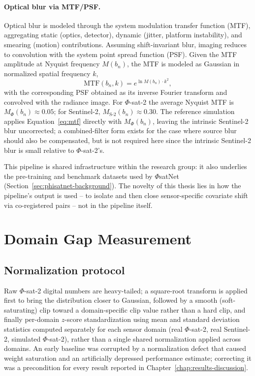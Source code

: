 \paragraph{Optical blur via MTF/PSF.}
Optical blur is modeled through the system modulation transfer function (MTF), aggregating static (optics, detector), dynamic (jitter, platform instability), and smearing (motion) contributions.
Assuming shift-invariant blur, imaging reduces to convolution with the system point spread function (PSF).
Given the MTF amplitude at Nyquist frequency $M(b_n)$, the MTF is modeled as Gaussian in normalized spatial frequency $k$,
\begin{equation}
    \text{MTF}(b_n, k) = e^{\ln M(b_n) \cdot k^2},
    \label{eq:mtf}
\end{equation}
with the corresponding PSF obtained as its inverse Fourier transform and convolved with the radiance image.
For $\Phi$-sat-2 the average Nyquist MTF is $M_\Phi(b_n) \approx 0.05$; for Sentinel-2, $M_{\text{S-2}}(b_n) \approx 0.30$.
The reference simulation applies Equation~\eqref{eq:mtf} directly with $M_\Phi(b_n)$, leaving the intrinsic Sentinel-2 blur uncorrected; a combined-filter form exists for the case where source blur should also be compensated, but is not required here since the intrinsic Sentinel-2 blur is small relative to $\Phi$-sat-2's.

This pipeline is shared infrastructure within the research group: it also underlies the pre-training and benchmark datasets used by $\Phi$satNet (Section~\ref{sec:phisatnet-background}).
The novelty of this thesis lies in how the pipeline's output is used -- to isolate and then close sensor-specific covariate shift via co-registered pairs -- not in the pipeline itself.

\section{Domain Gap Measurement}
\label{sec:gap-measurement}

\subsection{Normalization protocol}
\label{sec:normalization}

Raw $\Phi$-sat-2 digital numbers are heavy-tailed; a square-root transform is applied first to bring the distribution closer to Gaussian, followed by a smooth (soft-saturating) clip toward a domain-specific clip value rather than a hard clip, and finally per-domain $z$-score standardization using mean and standard deviation statistics computed separately for each sensor domain (real $\Phi$-sat-2, real Sentinel-2, simulated $\Phi$-sat-2), rather than a single shared normalization applied across domains.
An early baseline was corrupted by a normalization defect that caused weight saturation and an artificially depressed performance estimate; correcting it was a precondition for every result reported in Chapter~\ref{chap:results-discussion}.


